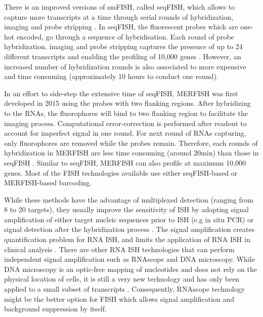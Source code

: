 There is an improved versions of smFISH, called seqFISH, which allows to capture more transcripts at a time through serial rounds of hybridization, imaging and probe stripping \cite{asp2020spatially}. In seqFISH, the fluorescent probes which are one-hot encoded, go through a sequence of hybridisation. Each round of probe hybridization, imaging and probe stripping captures the presence of up to 24 different transcripts and enabling the profiling of 10,000 genes \cite{moses2022museum,eng2019transcriptome}. However, an increased number of hybridization rounds is also associated to more expensive and time consuming (approximately 10 hours to conduct one round). 

In an effort to side-step the extensive time of seqFISH, MERFISH was first developed in 2015 \cite{chen2015spatially} using the probes with two flanking regions. After hybridizing to the RNAs, the fluorophores will bind to two flanking region to facilitate the imaging process. Computational error-correction is performed after readout to account for imperfect signal in one round. For next round of RNAs capturing, only fluorophores are removed while the probes remain. Therefore, each rounds of hybridization in MERFISH are less time consuming (around 20min) than those in seqFISH \cite{moses2022museum}. Similar to seqFISH, MERFISH can also profile at maximum 10,000 genes. Most of the FISH technologies available use either seqFISH-based or MERFISH-based barcoding. 

While these methods have the advantage of multiplexed detection (ranging from 8 to 20 targets), they usually improve the sensitivity of ISH by adopting signal amplification of either target nucleic sequences prior to ISH (e.g in situ PCR) or signal detection after the hybridization process \cite{qian2003recent}. The signal amplification creates quantification problem for RNA ISH, and limits the application of RNA ISH in clinical analysis \cite{levsky2003fluorescence,wang2012rnascope}. There are other RNA ISH technologies that can perform independent signal amplification such as RNAscope and DNA microscopy. While DNA microscopy is an optic-free mapping of nucleotides and does not rely on the physical location of cells, it is still a very new technology and has only been applied to a small subset of transcripts \cite{asp2020spatially,weinstein2019dna}. Consequently, RNAscope technology might be the better option for FISH which allows signal amplification and background suppression by itself.

